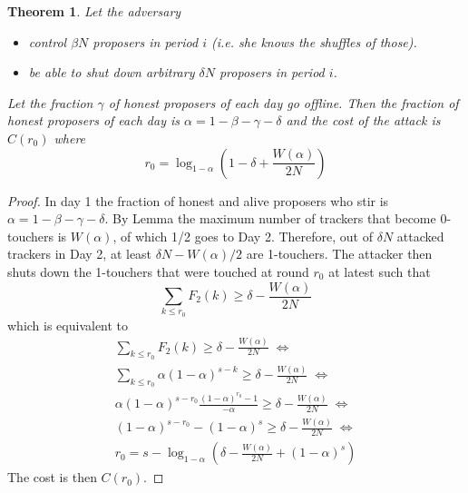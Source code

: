 \documentclass{article}
\newtheorem{theorem}{Theorem}
\begin{document}
\begin{theorem} Let the adversary
\begin{itemize}
    \item control $\beta N$ proposers in period $i$ (i.e. she knows the shuffles of those).
    \item be able to shut down arbitrary $\delta N$ proposers in period $i$. 
\end{itemize} 
Let the fraction $\gamma$ of honest proposers of each day go offline. 
Then the fraction of honest proposers of each day is $\alpha = 1- \beta-\gamma-\delta$ and the cost of the attack is $C(r_0)$
 where $$
r_0= \log_{1-\alpha}(1-\delta + \frac{W(\alpha)}{2N})
$$

\end{theorem}
\begin{proof} In day 1 the fraction of honest and alive proposers who stir is $\alpha = 1- \beta-\gamma-\delta$. By Lemma the maximum number of trackers that become 0-touchers is $W(\alpha)$, of which 1/2 goes to Day 2. Therefore, out of $\delta N$ attacked trackers in Day 2, at least $\delta N - W(\alpha)/2$ are 1-touchers. The attacker then shuts down the 1-touchers that were touched at round $r_0$ at latest such that
$$
\sum_{k\leq r_0}F_2(k)\geq \delta - \frac{W(\alpha)}{2N}
$$
which is equivalent to \begin{align}
\sum_{k\leq r_0}F_2(k)\geq \delta - \frac{W(\alpha)}{2N}\;\Leftrightarrow\\
\sum_{k\leq r_0}\alpha(1-\alpha)^{s-k}\geq \delta - \frac{W(\alpha)}{2N}\;\Leftrightarrow\\
\alpha(1-\alpha)^{s-r_0}\frac{(1-\alpha)^{r_0}-1}{-\alpha}\geq \delta - \frac{W(\alpha)}{2N}\;\Leftrightarrow\\
(1-\alpha)^{s-r_0}-(1-\alpha)^s\geq \delta - \frac{W(\alpha)}{2N}\;\Leftrightarrow\\
r_0 = s-\log_{1-\alpha}\left(  \delta - \frac{W(\alpha)}{2N}+(1-\alpha)^s\right)
\end{align}
The cost is then $C(r_0)$.
\end{proof}
\end{document}
